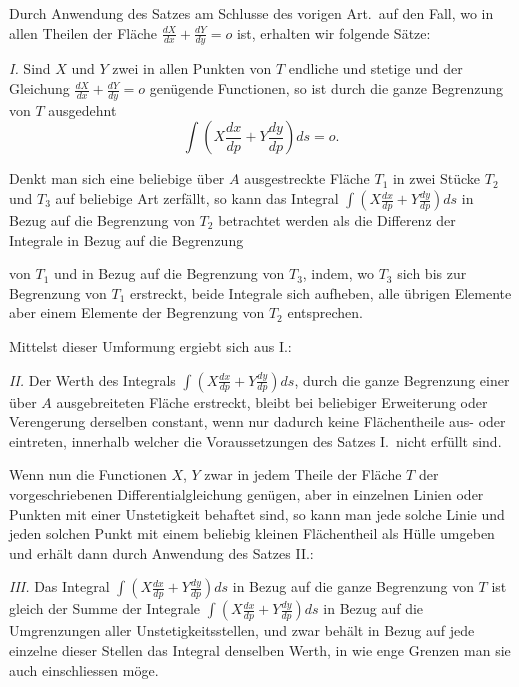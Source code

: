 \documentclass{article}
\begin{document}
Durch Anwendung des Satzes am Schlusse des vorigen Art.\ auf den Fall, wo in allen Theilen der Fläche $\frac{dX}{dx} + \frac{dY}{dy} = o$ ist, erhalten wir folgende Sätze:

\emph{I.} Sind $X$ und $Y$ zwei in allen Punkten von $T$ endliche und stetige und der Gleichung $\frac{dX}{dx} + \frac{dY}{dy} = o$ genügende Functionen, so ist durch die ganze Begrenzung von $T$ ausgedehnt
\[
\int \left(X\frac{dx}{dp} + Y\frac{dy}{dp}\right) ds = o.
\]

Denkt man sich eine beliebige über $A$ ausgestreckte Fläche $T_1$ in zwei Stücke $T_2$ und $T_3$ auf beliebige Art zerfällt, so kann das Integral $\displaystyle\int \left(X\frac{dx}{dp} + Y\frac{dy}{dp}\right) ds$ in Bezug auf die Begrenzung von $T_2$ betrachtet werden als die Differenz der Integrale in Bezug auf die Begrenzung

von $T_1$ und in Bezug auf die Begrenzung von $T_3$, indem, wo $T_3$ sich bis zur Begrenzung von $T_1$ erstreckt, beide Integrale sich aufheben, alle übrigen Elemente aber einem Elemente der Begrenzung von $T_2$ entsprechen.

Mittelst dieser Umformung ergiebt sich aus I.:

\emph{II.} Der Werth des Integrals $\displaystyle\int \left(X\frac{dx}{dp} + Y\frac{dy}{dp}\right) ds$, durch die ganze Begrenzung einer über $A$ ausgebreiteten Fläche erstreckt, bleibt bei beliebiger Erweiterung oder Verengerung derselben constant, wenn nur dadurch keine Flächentheile aus- oder eintreten, innerhalb welcher die Voraussetzungen des Satzes I.\ nicht erfüllt sind.

Wenn nun die Functionen $X$, $Y$ zwar in jedem Theile der Fläche $T$ der vorgeschriebenen Differentialgleichung genügen, aber in einzelnen Linien oder Punkten mit einer Unstetigkeit behaftet sind, so kann man jede solche Linie und jeden solchen Punkt mit einem beliebig kleinen Flächentheil als Hülle umgeben und erhält dann durch Anwendung des Satzes II.:

\emph{III.} Das Integral $\displaystyle\int \left(X\frac{dx}{dp} + Y\frac{dy}{dp}\right) ds$ in Bezug auf die ganze Begrenzung von $T$ ist gleich der Summe der Integrale $\displaystyle\int \left(X\frac{dx}{dp} + Y\frac{dy}{dp}\right) ds$ in Bezug auf die Umgrenzungen aller Unstetigkeitsstellen, und zwar behält in Bezug auf jede einzelne dieser Stellen das Integral denselben Werth, in wie enge Grenzen man sie auch einschliessen möge.
\end{document}
